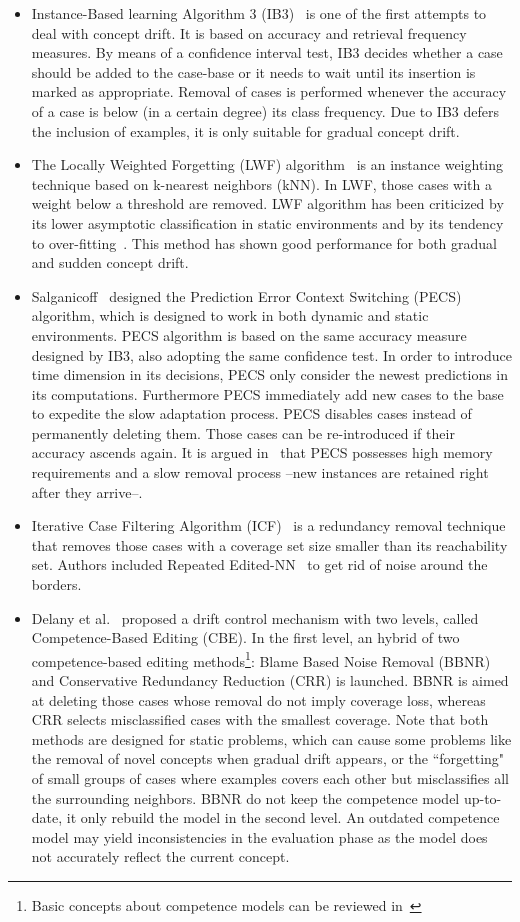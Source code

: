 \documentclass[preprint,12pt]{elsarticle}
\begin{document}
\begin{itemize}
	\item Instance-Based learning Algorithm 3 (IB3)~\cite{aha91} is one of the first attempts to deal with concept drift. It is based on accuracy and retrieval frequency measures. By means of a confidence interval test, IB3 decides whether a case should be added to the case-base or it needs to wait until its insertion is marked as appropriate. Removal of cases is performed whenever the accuracy of a case is below (in a certain degree) its class frequency. Due to IB3 defers the inclusion of examples, it is only suitable for gradual concept drift. 
	\item The Locally Weighted Forgetting (LWF) algorithm~\cite{salga93} is an instance weighting technique based on k-nearest neighbors (kNN). In LWF, those cases with a weight below a threshold are removed. LWF algorithm has been criticized by its lower asymptotic classification in static environments and by its tendency to over-fitting~\cite{klinken04}. This method has shown good performance for both gradual and sudden concept drift. 
	\item Salganicoff~\cite{salga97} designed the Prediction Error Context Switching (PECS) algorithm, which is designed to work in both dynamic and static environments. PECS algorithm is based on the same accuracy measure designed by IB3, also adopting the same confidence test. In order to introduce time dimension in its decisions, PECS only consider the newest predictions in its computations. Furthermore PECS immediately add new cases to the base to expedite the slow adaptation process. PECS disables cases instead of permanently deleting them. Those cases can be re-introduced if their accuracy ascends again. It is argued in~\cite{berin07} that PECS possesses high memory requirements and a slow removal process --new instances are retained right after they arrive--.
	\item Iterative Case Filtering Algorithm (ICF)~\cite{brighton02} is a redundancy removal technique that removes those cases with a coverage set size smaller than its reachability set. Authors included Repeated Edited-NN~\cite{tomek76} to get rid of noise around the borders.
	\item Delany et al.~\cite{delany05} proposed a drift control mechanism with two levels, called Competence-Based Editing (CBE). In the first level, an hybrid of two competence-based editing methods\footnote{Basic concepts about competence models can be reviewed in~\cite{smyth95}}: Blame Based Noise Removal (BBNR) and Conservative Redundancy Reduction (CRR) is launched. BBNR is aimed at deleting those cases whose removal do not imply coverage loss, whereas CRR selects misclassified cases with the smallest coverage. Note that both methods are designed for static problems, which can cause some problems like the removal of novel concepts when gradual drift appears, or the ``forgetting" of small groups of cases where examples covers each other but misclassifies all the surrounding neighbors. BBNR do not keep the competence model up-to-date, it only rebuild the model in the second level. An outdated competence model may yield inconsistencies in the evaluation phase as the model does not accurately reflect the current concept.

\end{itemize}
\end{document}
